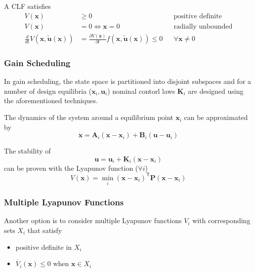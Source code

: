 \newpar{}
A CLF satisfies
\noindent\begin{align*}
    V(\mathbf{x})                                              & \geq 0                                                                                           &  & \text{positive definite}  \\
    V(\mathbf{x})                                              & = 0 \Leftrightarrow \mathbf{x} = 0                                                               &  & \text{radially unbounded} \\
    \frac{d}{dt} V(\mathbf{x}, \tilde{\mathbf{u}}(\mathbf{x})) & = \frac{\partial V(\mathbf{x})}{\partial t} f(\mathbf{x}, \tilde{\mathbf{u}}(\mathbf{x})) \leq 0 &  & \forall \mathbf{x}\neq 0
\end{align*}

\subsubsection{Gain Scheduling}
In gain scheduling, the state space is partitioned into disjoint subspaces and for a number of design equilibria ($\mathbf{x}_i, \mathbf{u}_i$)  nominal contorl laws $\mathbf{K}_i$ are designed using the aforementioned techniques.

\newpar{}
The dynamics of the system around a equilibrium point $\mathbf{x}_i$ can be approximated by
\noindent\begin{equation*}
    \dot{\mathbf{x}} = \mathbf{A}_i(\mathbf{x}-\mathbf{x}_i) + \mathbf{B}_i(\mathbf{u}-\mathbf{u}_i)
\end{equation*}

The stability of
\noindent\begin{equation*}
    \mathbf{u} = \mathbf{u}_i+\mathbf{K}_i(\mathbf{x}-\mathbf{x}_i)
\end{equation*}
can be proven with the Lyapunov function ($\forall i$)
\noindent\begin{equation*}
    V(\mathbf{x}) = \min_{i} {(\mathbf{x}-\mathbf{x}_i)}^{\mathsf{T}}\mathbf{P}(\mathbf{x}-\mathbf{x}_i)
\end{equation*}

\subsubsection{Multiple Lyapunov Functions}
Another option is to consider multiple Lyapunov functions $V_i$ with corresponding sets $X_i$ that satisfy
\begin{itemize}
    \item positive definite in $X_i$
    \item $\dot{V_i}(\mathbf{x})\leq 0$ when $\mathbf{x}\in X_i$
\end{itemize}

